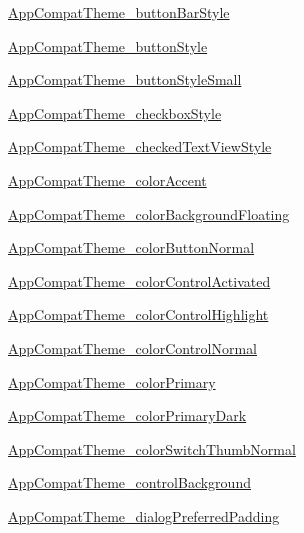 \begin{Desc}
\hyperlink{classandroid_1_1support_1_1v4_1_1_r_1_1styleable_f62e556ecad9de84a7a256eb8b485488}{AppCompatTheme\_\-buttonBarStyle} 

\hyperlink{classandroid_1_1support_1_1v4_1_1_r_1_1styleable_a567eb6928ba9055a784ae2ad69d63f8}{AppCompatTheme\_\-buttonStyle} 

\hyperlink{classandroid_1_1support_1_1v4_1_1_r_1_1styleable_71e1206792e08e069496577fcab26e1b}{AppCompatTheme\_\-buttonStyleSmall} 

\hyperlink{classandroid_1_1support_1_1v4_1_1_r_1_1styleable_2952864b487c0fdf826370ab068042b3}{AppCompatTheme\_\-checkboxStyle} 

\hyperlink{classandroid_1_1support_1_1v4_1_1_r_1_1styleable_504638bb33551868625294f24e6d75c7}{AppCompatTheme\_\-checkedTextViewStyle} 

\hyperlink{classandroid_1_1support_1_1v4_1_1_r_1_1styleable_3b87ab5d2175f20e4b41056387826bdc}{AppCompatTheme\_\-colorAccent} 

\hyperlink{classandroid_1_1support_1_1v4_1_1_r_1_1styleable_2345bf81c44b196ed19b9beae5d073b2}{AppCompatTheme\_\-colorBackgroundFloating} 

\hyperlink{classandroid_1_1support_1_1v4_1_1_r_1_1styleable_9222a7848886917a4f8f848b38a41538}{AppCompatTheme\_\-colorButtonNormal} 

\hyperlink{classandroid_1_1support_1_1v4_1_1_r_1_1styleable_2d7dc080e71e4c68a0321538983ca317}{AppCompatTheme\_\-colorControlActivated} 

\hyperlink{classandroid_1_1support_1_1v4_1_1_r_1_1styleable_346d6c8a5cb33583cb24fea2db2499ae}{AppCompatTheme\_\-colorControlHighlight} 

\hyperlink{classandroid_1_1support_1_1v4_1_1_r_1_1styleable_dbb405fc0a9198e2e1ebbedf54fa8518}{AppCompatTheme\_\-colorControlNormal} 

\hyperlink{classandroid_1_1support_1_1v4_1_1_r_1_1styleable_000f8fd391639a0e396991fb848871f7}{AppCompatTheme\_\-colorPrimary} 

\hyperlink{classandroid_1_1support_1_1v4_1_1_r_1_1styleable_d4bbe6369273502bd320159d8f9742fb}{AppCompatTheme\_\-colorPrimaryDark} 

\hyperlink{classandroid_1_1support_1_1v4_1_1_r_1_1styleable_6ea63f1233fe0a7b2a627bae8dbdb446}{AppCompatTheme\_\-colorSwitchThumbNormal} 

\hyperlink{classandroid_1_1support_1_1v4_1_1_r_1_1styleable_b1ed611d790b8dc74dd266f0047196a2}{AppCompatTheme\_\-controlBackground} 

\hyperlink{classandroid_1_1support_1_1v4_1_1_r_1_1styleable_6100ebfbe6b8c50952783dcdd55473e4}{AppCompatTheme\_\-dialogPreferredPadding} 


\end{Desc}
